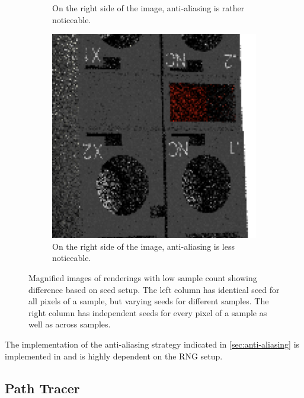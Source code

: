 \begin{figure}[H]
\begin{subfigure}[t]{0.3\textwidth}
        \caption{On the right side of the image, anti-aliasing is rather noticeable.}
        \label{fig:rngNoiseArtifactsHighlightsBadAnti}
    \end{subfigure}
    \hfill
    \begin{subfigure}[t]{0.3\textwidth}
        \includegraphics[width=\textwidth]{resources/good-seed-anti-aliasing.png}
        \caption{On the right side of the image, anti-aliasing is less noticeable.}
        \label{fig:rngNoiseArtifactsHighlightsGoodAnti}
    \end{subfigure}
    \hspace*{2cm}
    \caption{Magnified images of renderings with low sample count showing difference based on seed setup. The left column has identical seed for all pixels of a sample, but varying seeds for different samples. The right column has independent seeds for every pixel of a sample as well as across samples.}
    \label{fig:rngNoiseArtifactsHighlights}
\end{figure}

\label{sec:anti-aliasing-implementation}
The implementation of the anti-aliasing strategy indicated in \ref{sec:anti-aliasing} is implemented in  and is highly dependent on the \gls{RNG} setup.

\subsection*{Path Tracer}

